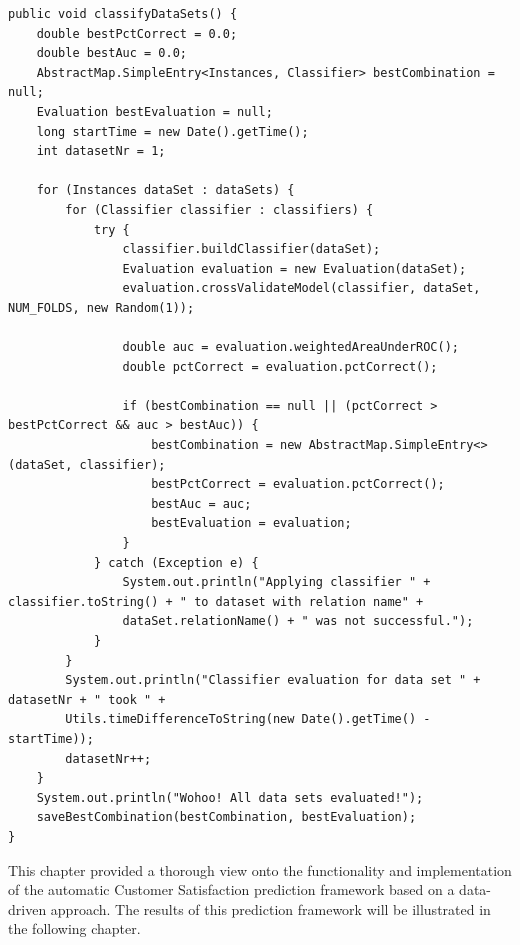 \begin{lstlisting}[caption={Applying configured classifiers on preprocessed data sets}, label={lst:classificationEngine}]
public void classifyDataSets() {
	double bestPctCorrect = 0.0;
	double bestAuc = 0.0;
	AbstractMap.SimpleEntry<Instances, Classifier> bestCombination = null;
	Evaluation bestEvaluation = null;
	long startTime = new Date().getTime();
	int datasetNr = 1;
	
	for (Instances dataSet : dataSets) {
		for (Classifier classifier : classifiers) {
			try {
				classifier.buildClassifier(dataSet);
				Evaluation evaluation = new Evaluation(dataSet);
				evaluation.crossValidateModel(classifier, dataSet, NUM_FOLDS, new Random(1));
	
				double auc = evaluation.weightedAreaUnderROC();
				double pctCorrect = evaluation.pctCorrect();
				
				if (bestCombination == null || (pctCorrect > bestPctCorrect && auc > bestAuc)) {
					bestCombination = new AbstractMap.SimpleEntry<>(dataSet, classifier);
					bestPctCorrect = evaluation.pctCorrect();
					bestAuc = auc;
					bestEvaluation = evaluation;
				}
			} catch (Exception e) {
				System.out.println("Applying classifier " + classifier.toString() + " to dataset with relation name" +
				dataSet.relationName() + " was not successful.");
			}
		}
		System.out.println("Classifier evaluation for data set " + datasetNr + " took " +
		Utils.timeDifferenceToString(new Date().getTime() - startTime));
		datasetNr++;
	}
	System.out.println("Wohoo! All data sets evaluated!");
	saveBestCombination(bestCombination, bestEvaluation);
}
\end{lstlisting}

This chapter provided a thorough view onto the functionality and implementation of the automatic Customer Satisfaction prediction framework based on a data-driven approach. The results of this prediction framework will be illustrated in the following chapter.







 




